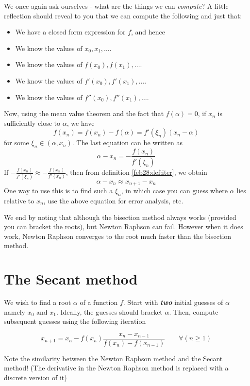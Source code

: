 We once again ask ourselves - what are the things we can \textit{compute}? A little reflection should reveal to you that we can compute the following and just that:
\begin{itemize}
\item
  We have a closed form expression for $f$, and hence

\item
  We know the values of $x_0, x_1, \dots$.

\item
  We know the values of $f(x_0), f(x_1), \dots$.

\item
  We know the values of $f'(x_0), f'(x_1), \dots$.

\item
  We know the values of $f''(x_0), f''(x_1), \dots$.
\end{itemize}
Now, using the mean value theorem and the fact that $f(\alpha) = 0$, if $x_n$ is sufficiently close to $\alpha$, we have
\[
  f(x_n) = f(x_n) - f(\alpha) = f'(\xi_n)(x_n - \alpha)
\]
for some $\xi_n \in (\alpha, x_n)$. The last equation can be written as
\[
  \alpha - x_n = - \frac{f(x_n)}{f'(\xi_n)}
\]
If $- \frac{f(x_n)}{f'(\xi_n)} \approx - \frac{f(x_n)}{f'(x_n)}$, then from definition \ref{feb28:def:iter}, we obtain
\[
  \alpha - x_n \approx x_{n+1} - x_n
\]
One way to use this is to find such a $\xi_n$, in which case you can guess where $\alpha$ lies relative to $x_n$, use the above equation for error analysis, etc.

We end by noting that although the bisection method always works (provided you can bracket the roots), but Newton Raphson can fail. However when it does work, Newton Raphson converges to the root much faster than the bisection method.

\section{The Secant method}

We wish to find a root $\alpha$ of a function $f$. Start with \textbf{\textit{two}} initial guesses of $\alpha$ namely $x_0$ and $x_1$. Ideally, the guesses should bracket $\alpha$. Then, compute subsequent guesses using the following iteration
\begin{defn}
  \[
    x_{n+1} = x_n - f(x_n)\frac{x_n - x_{n-1}}{f(x_n) - f(x_{n-1})} \qquad \forall(n \geq 1)
  \]
\end{defn}
Note the similarity between the Newton Raphson method and the Secant method! (The derivative in the Newton Raphson method is replaced with a discrete version of it)


